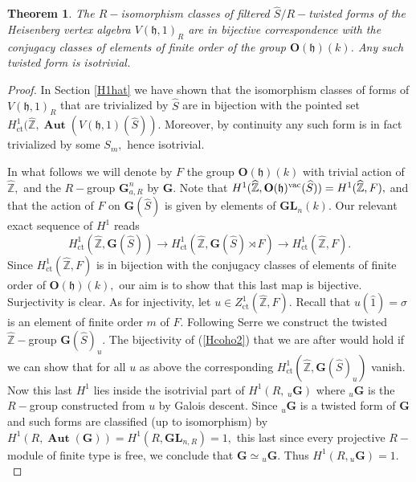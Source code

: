 \documentclass{article}
\newtheorem{thm}{Theorem}[section]
\theoremstyle{definition}
\def\BAut{\ensuremath{\operatorname{\mathbf{Aut}}}}
\def\BG{\ensuremath{\mathbf{G}}}
\def\BGL{\ensuremath{\mathbf{G}\mathbf{L}}}
\def\hZ{\ensuremath{\widehat{\mathbb Z}}}
\def\hS{\ensuremath{\widehat S}}
\begin{document}
 \begin{thm}\label{Hforms} %
 The $R-$isomorphism classes of filtered $\widehat S/R-$twisted forms of the Heisenberg vertex algebra $V(\mathfrak h,1)_R$ are in bijective correspondence with the conjugacy classes of elements of finite order of the group $\mathbf O(\mathfrak h)(k)$. Any such twisted form is isotrivial.
\end{thm}

 \begin{proof}   In Section \ref{H1hat} we have shown that the isomorphism classes of forms of $V(\mathfrak h,1)_R$ that are trivialized by  $\hS$ are in bijection with the pointed set $ H^1_{\operatorname{ct}} (\widehat {\mathbb Z}, \BAut(V(\mathfrak h, 1)(\widehat S)).$ Moreover, by continuity any such form is in fact trivialized by some $S_m,$ hence isotrivial. 
 
 In what follows we will denote by $F$ the group $ \mathbf O(\mathfrak h)(k)$ with trivial action of $\hZ,$  and the $R-$group $\mathbf G_{a, R}^n$ by $\BG.$ Note that $H^1(\hZ, \mathbf O(\mathfrak h)^{\rm vac}(\hS)) = H^1(\hZ, F),$ and  that the action of $F$ on $\BG(\hS)$ is given by elements of $\BGL_n(k).$ Our relevant exact sequence of $H^1$ reads
     \begin{equation}\label{Hcoho2} 
  H^1_{\operatorname{ct}}(\hZ, \mathbf G(\hS)) \rightarrow H^1_{\operatorname{ct}}(\hZ, \mathbf G(\hS) \rtimes F) \rightarrow H^1_{\operatorname{ct}}(\hZ, F).   \end{equation}
  Since $H^1_{\operatorname{ct}}(\hZ, F)$ is in bijection with the conjugacy classes of elements of finite order of $\mathbf O(\mathfrak h)(k),$ our aim is to show that this last map is bijective. Surjectivity is clear. As for injectivity, let $u \in Z^1_{\operatorname{ct}}(\hZ, F). $ Recall that $u(\hat{1}) = \sigma$ is an element of finite order $m$ of $F.$  Following Serre \cite{Se} we construct the twisted $\hZ-$group  $\mathbf G(\hS)_u.$ The bijectivity of (\ref{Hcoho2}) that we are after would hold if we can show that for all $u$ as above the corresponding $H^1_{\operatorname{ct}}(\hZ, \mathbf G(\hS)_u)$ vanish. Now this last $H^1$ lies inside the isotrivial part of $H^1(R, \, {_u}\BG)$ where ${_u}\BG$ is the $R-$group constructed from $u$ by Galois descent. Since ${_u}\BG$ is a twisted form of $\BG$ and such forms  are classified (up to isomorphism) by $H^1(R, \BAut(\BG)) = H^1(R, \BGL_{n,R}) = 1,$ this last since every projective $R-$module of finite type  is free, we conclude that $\BG \simeq  {_u\BG}.$ Thus $H^1(R, {_u}\BG) = 1.$
  \end{proof}
\end{document}
